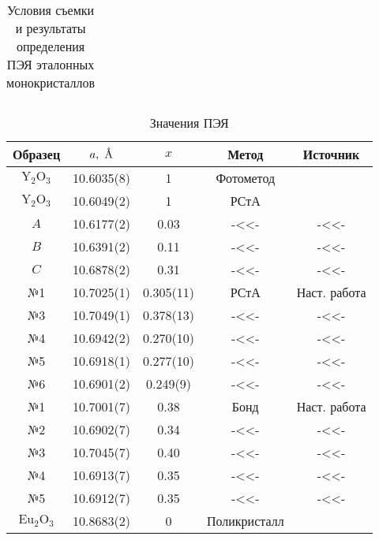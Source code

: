 \begin{table}[ht!]
\begin{tabular}{|c|c|c|c|c|c|}
    \end{tabular}
    \caption{Условия съемки и результаты определения ПЭЯ эталонных монокристаллов}%
    \label{tab:measured}
\end{table}

\begin{table}[ht!]
    \centering
    \begin{tabular}{|c|c|c|c|c|}
    \hline
    Образец & $a,\ \text{\AA}$ & $x$ & Метод         & Источник             \\ \hline
    $\text{Y}_2\text{O}_3$  & 10.6035(8) & 1         & Фотометод     & \cite{Paton:1965}    \\ \hline
    $\text{Y}_2\text{O}_3$  & 10.6049(2) & 1         & РСтА          & \cite{Nikolaev:2023} \\ \hline
    $A$     & 10.6177(2) & 0.03      & -<<-          & -<<-                 \\ \hline
    $B$     & 10.6391(2) & 0.11      & -<<-          & -<<-                 \\ \hline
    $C$    & 10.6878(2) & 0.31      & -<<-          & -<<-                 \\ \hline
    №1    & 10.7025(1) & 0.305(11) & РСтА          &  Наст. работа        \\ \hline
    №3    & 10.7049(1) & 0.378(13) & -<<-          & -<<-                 \\ \hline
    №4    & 10.6942(2) & 0.270(10) & -<<-          & -<<-                 \\ \hline
    №5    & 10.6918(1) & 0.277(10) & -<<-          & -<<-                 \\ \hline
    №6    & 10.6901(2) & 0.249(9)  & -<<-          & -<<-                 \\ \hline
    №1    & 10.7001(7) & 0.38      & Бонд          & Наст. работа         \\ \hline
    №2    & 10.6902(7) & 0.34      & -<<-          & -<<-                 \\ \hline
    №3    & 10.7045(7) & 0.40      & -<<-          & -<<-                 \\ \hline
    №4    & 10.6913(7) & 0.35      & -<<-          & -<<-                 \\ \hline
    №5    & 10.6912(7) & 0.35      & -<<-          & -<<-                 \\ \hline
    $\text{Eu}_2\text{O}_3$ & 10.8683(2) & 0         & Поликристалл  & \cite{Morris:1984}   \\ \hline
    \end{tabular}
    \caption{Значения ПЭЯ \YEu{}}%
    \label{tab:YEu}
\end{table}
